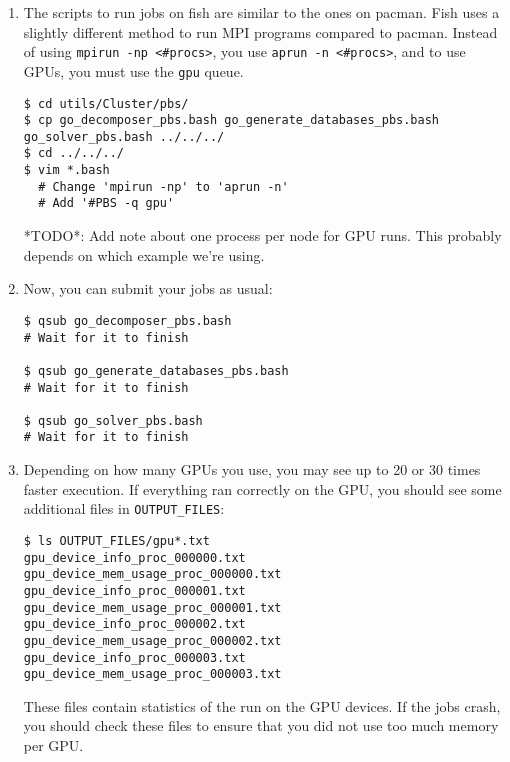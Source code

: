 \documentclass[10pt,fleqn,letterpaper]{article}
\begin{document}
\begin{enumerate}
\item The scripts to run jobs on fish are similar to the ones on pacman. Fish
      uses a slightly different method to run MPI programs compared to pacman.
      Instead of using \verb|mpirun -np <#procs>|, you use
      \verb|aprun -n <#procs>|, and to use GPUs, you must use the \verb|gpu|
      queue.
\begin{lstlisting}
$ cd utils/Cluster/pbs/
$ cp go_decomposer_pbs.bash go_generate_databases_pbs.bash go_solver_pbs.bash ../../../
$ cd ../../../
$ vim *.bash
  # Change 'mpirun -np' to 'aprun -n'
  # Add '#PBS -q gpu'
\end{lstlisting}
*TODO*: Add note about one process per node for GPU runs. This probably depends
on which example we're using.

\item Now, you can submit your jobs as usual:
\begin{lstlisting}
$ qsub go_decomposer_pbs.bash
# Wait for it to finish

$ qsub go_generate_databases_pbs.bash
# Wait for it to finish

$ qsub go_solver_pbs.bash
# Wait for it to finish
\end{lstlisting}

\item Depending on how many GPUs you use, you may see up to 20 or 30 times
      faster execution. If everything ran correctly on the GPU, you should see
      some additional files in \verb|OUTPUT_FILES|:
\begin{lstlisting}
$ ls OUTPUT_FILES/gpu*.txt
gpu_device_info_proc_000000.txt
gpu_device_mem_usage_proc_000000.txt
gpu_device_info_proc_000001.txt
gpu_device_mem_usage_proc_000001.txt
gpu_device_info_proc_000002.txt
gpu_device_mem_usage_proc_000002.txt
gpu_device_info_proc_000003.txt
gpu_device_mem_usage_proc_000003.txt
\end{lstlisting}

      These files contain statistics of the run on the GPU devices. If the jobs
      crash, you should check these files to ensure that you did not use too
      much memory per GPU.
\end{enumerate}


%
%

\end{document}
